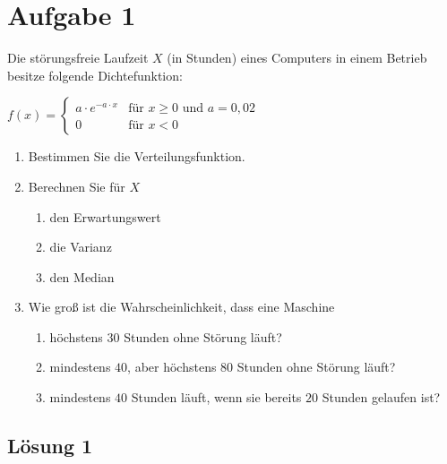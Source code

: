 \documentclass[main.tex]{subfiles}
\begin{document}
\section{Aufgabe 1}
Die störungsfreie Laufzeit $X$ (in Stunden) eines Computers in einem Betrieb besitze folgende Dichtefunktion:
\begin{center}
$f(x)=\begin{cases}
		a \cdot e^{-a \cdot x}	& \text{für } x \geq 0 \text{ und } a = 0,02\\
		0												& \text{für } x < 0
\end{cases}$
\end{center}
\begin{enumerate}
\item Bestimmen Sie die Verteilungsfunktion.
\item Berechnen Sie für $X$
\begin{enumerate}
\item den Erwartungswert 
\item die Varianz 
\item den Median
\end{enumerate}
\item Wie groß ist die Wahrscheinlichkeit, dass eine Maschine
\begin{enumerate}
\item höchstens $30$ Stunden ohne Störung läuft?
\item mindestens $40$, aber höchstens $80$ Stunden ohne Störung läuft?
\item mindestens $40$ Stunden läuft, wenn sie bereits $20$ Stunden gelaufen ist?
\end{enumerate}
\end{enumerate}

\subsection{Lösung 1}
\end{document}
